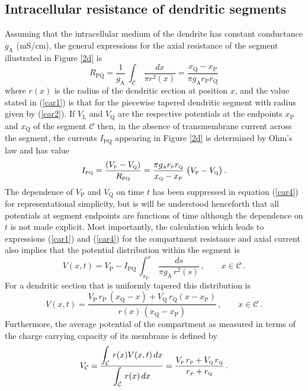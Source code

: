 \subsection{Intracellular resistance of dendritic segments}
Assuming that the intracellular medium of the dendrite has
constant conductance $g_\mathrm{A}$ (mS/cm), the general
expressions for the axial resistance of the segment illustrated in
Figure \ref{2d} is
\begin{equation}\label{car1}
R_\mathrm{PQ} = \frac{1}{g_\mathrm{A}}\,
\int_{\mathcal{C}}\,\frac{dx}{\pi r^2(x)}=
\frac{x_\mathrm{Q}-x_\mathrm{P}}
{\pi g_\mathrm{A} r_\mathrm{P}r_\mathrm{Q}}
\end{equation}
where $r(x)$ is the radius of the dendritic section at position
$x$, and the value stated in (\ref{car1}) is that for the
piecewise tapered dendritic segment with radius given by
(\ref{car2}). If $V_\mathrm{L}$ and $V_\mathrm{Q}$ are the
respective potentials at the endpoints $x_\mathrm{P}$ and
$x_\mathrm{Q}$ of the segment $\mathcal{C}$ then, in the absence
of transmembrane current across the segment, the currents
$I_\mathrm{PQ}$ appearing in Figure \ref{2d} is determined by
Ohm's law and has value
\begin{equation}\label{car4}
I_{\mbox{\tiny PQ}} = \displaystyle\frac{(V_{\mbox{\tiny P}}-V_{\mbox{\tiny Q}})}
{R_{\mbox{\tiny PQ}}} = \frac{\pi g_{\mbox{\tiny A}}r_{\mbox{\tiny P}}r_{\mbox{\tiny Q}}}
{x_{\mbox{\tiny Q}}-x_{\mbox{\tiny P}}}\;\big(V_{\mbox{\tiny P}}-V_{\mbox{\tiny Q}}\big)\,.
\end{equation}
The dependence of $V_\mathrm{P}$ and $V_\mathrm{Q}$ on time $t$
has been suppressed in equation (\ref{car4}) for representational
simplicity, but is will be understood henceforth that all
potentials at segment endpoints are functions of time although the
dependence on $t$ is not made explicit. Most importantly, the
calculation which leads to expressions (\ref{car1}) and
(\ref{car4}) for the compartment resistance and axial current also
implies that the potential distribution within the segment is
\begin{equation}\label{tc1}
V(x,t) = V_\mathrm{P}-I_\mathrm{PQ}\,\int^x_{x_\mathrm{P}}
\;\frac{ds}{\pi g_\mathrm{A}\,r^2(s)}\,,\qquad
x\in\mathcal{C}\,.
\end{equation}
For a dendritic section that is uniformly tapered this
distribution is
\begin{equation}\label{tc2}
V(x,t) = \frac{V_\mathrm{P}\,r_\mathrm{P}\,(x_\mathrm{Q}-x)+
V_\mathrm{Q}\,r_\mathrm{Q}(x-x_\mathrm{P})}{r(x)\,
(x_\mathrm{Q}-x_\mathrm{P})}\,,\qquad x\in\mathcal{C}\,.
\end{equation}
Furthermore, the average potential of the compartment as measured
in terms of the charge carrying capacity of its membrane is
defined by
\begin{equation}\label{tc3}
V_\mathcal{C}=\frac{\displaystyle\int_\mathcal{C}\,r(x)V(x,t)\,dx}
{\displaystyle\int_\mathcal{C}\,r(x)\,dx}=
\frac{V_{\mbox{\tiny P}}\,r_{\mbox{\tiny P}}+V_{\mbox{\tiny Q}}\,r_{\mbox{\tiny Q}}}
{r_{\mbox{\tiny P}}+r_{\mbox{\tiny Q}}}\,.
\end{equation}

